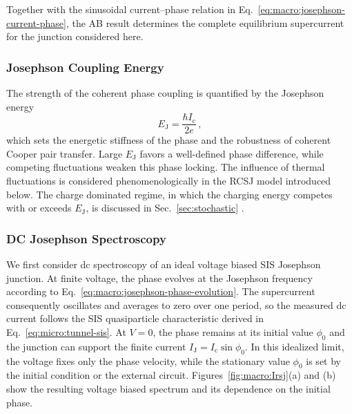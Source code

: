             Together with the sinusoidal current--phase relation in Eq.~\eqref{eq:macro:josephson-current-phase}, the AB result determines the complete equilibrium supercurrent for the junction considered here.

        \newpage
        \subsubsection*{Josephson Coupling Energy}

            The strength of the coherent phase coupling is quantified by the Josephson energy
            \begin{equation}
                E_\mathrm{J}=\frac{\hbar I_\mathrm{c}}{2e}\,,
                \label{eq:macro:josephson-energy}
            \end{equation}
            which sets the energetic stiffness of the phase and the robustness of coherent Cooper pair transfer. Large $E_\mathrm{J}$ favors a well-defined phase difference, while competing fluctuations weaken this phase locking. The influence of thermal fluctuations is considered phenomenologically in the RCSJ model introduced below. The charge dominated regime, in which the charging energy competes with or exceeds $E_\mathrm{J}$, is discussed in Sec.~\ref{sec:stochastic} \cite{tinkham_introduction_2004,grabert_single_2013}.

        \subsubsection*{DC Josephson Spectroscopy}

            We first consider dc spectroscopy of an ideal voltage biased SIS Josephson junction. At finite voltage, the phase evolves at the Josephson frequency according to Eq.~\eqref{eq:macro:josephson-phase-evolution}. The supercurrent consequently oscillates and averages to zero over one period, so the measured dc current follows the SIS quasiparticle characteristic derived in Eq.~\eqref{eq:micro:tunnel-sis}. At $V=0$, the phase remains at its initial value $\phi_0$ and the junction can support the finite current $I_\mathrm{J}=I_\mathrm{c}\sin\phi_0$. In this idealized limit, the voltage fixes only the phase velocity, while the stationary value $\phi_0$ is set by the initial condition or the external circuit. Figures~\ref{fig:macro:Irsj}(a) and (b) show the resulting voltage biased spectrum and its dependence on the initial phase.

